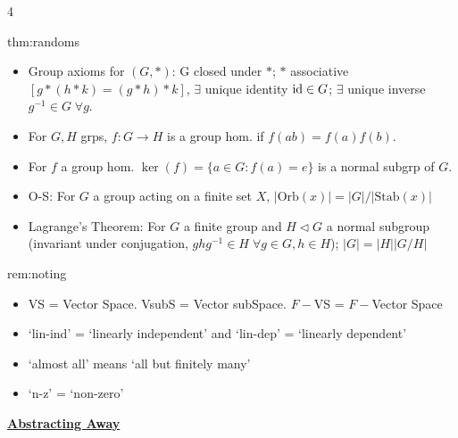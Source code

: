 \documentclass[landscape, 8pt]{extarticle}
\begin{document}
\begin{multicols*}{4}
		
		\begin{thm}{thm:randoms}{ }
			\begin{itemize}
				\item Group axioms for $(G, *)$: G closed under $*$; $*$ associative $[g*(h*k) = (g*h)*k]$, $\exists$ unique identity $\operatorname{id} \in G$; $\exists$ unique inverse $g^{-1}\in G \; \forall g$.
				\item For $G, H$ grps, $f: G \to H$ is a group hom. if $f(ab) = f(a)f(b)$.\\
				\item For $f$ a group hom. $\ker(f) = \{a\in G : f(a) = e\}$ is a normal subgrp of $G$.
				\item O-S: For $G$ a group acting on a finite set $X$, $\left|\text{Orb}(x)\right| = \left|G\right|/\left|\text{Stab}(x)\right|$
				\item Lagrange's Theorem: For $G$ a finite group and $H \triangleleft G$ a normal subgroup (invariant under conjugation, $ghg^{-1}\in H \; \forall g\in G, h\in H$); $\left|G\right| = \left|H\right| \left|G/H\right|$
			\end{itemize}
			
		\end{thm}
		
		
		\begin{rem}[Notation]{rem:noting}{ }
			\begin{itemize}
				\item VS = Vector Space. VsubS = Vector subSpace. $F-$VS = $F-$Vector Space
				\item `lin-ind'  = `linearly independent' and `lin-dep' = `linearly dependent'
				\item `almost all' means `all but finitely many'
				\item `n-z' = `non-zero'
			\end{itemize}
			
		\end{rem}
		
		
		
	
	
	{\footnotesize \textbf{\underline{Abstracting Away}}}
		

\end{multicols*}
\end{document}

